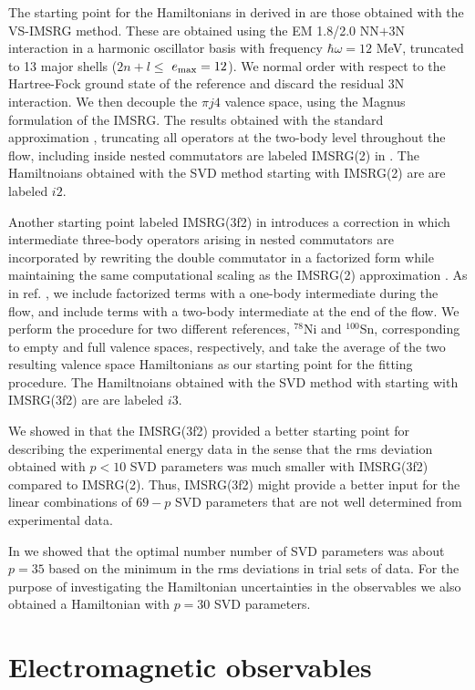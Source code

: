 \documentclass[aps,prl,twocolumn,tightenlines,superscriptaddress,showpacs]{revtex4-1}
\begin{document}
The starting point for the Hamiltonians in derived in \cite{p35i3}
are those obtained with the  VS-IMSRG method. These are
obtained using the EM 1.8/2.0 NN$+$3N interaction \cite{Heb2011} in a
harmonic oscillator basis with frequency $  \hbar \omega=12  $ MeV,
truncated to 13 major shells ($  2n+l \leq  $ $  e_{\rm max}=12  $). We normal order
with respect to the Hartree-Fock ground state of the reference and discard the
residual 3N interaction. We then decouple the $  \pi j4  $ valence space,
using the Magnus formulation of the IMSRG.
The results obtained with the standard approximation \cite{sr19}, truncating all
operators at the two-body level throughout the flow, including inside
nested commutators are labeled IMSRG(2) in \cite{p35i3}.
The Hamiltnoians obtained
with the SVD method starting with IMSRG(2) are are labeled $  i2  $.

Another starting point labeled IMSRG(3f2) in \cite{p35i3}
introduces a correction in which intermediate three-body operators arising
in nested commutators are incorporated by rewriting the double
commutator in a factorized form while maintaining the same computational
scaling as the IMSRG(2) approximation \cite{He24}. As in ref. \cite{He24}, we include factorized 
terms
with a one-body intermediate during the flow, and include terms with a
two-body intermediate at the end of the flow. We perform the procedure for
two different references, $^{78}$Ni and $^{100}$Sn, corresponding to empty
and full valence spaces, respectively, and take the average of the two resulting
valence space Hamiltonians as our starting point for the fitting procedure.
The Hamiltnoians obtained
with the SVD method with starting with IMSRG(3f2) are are labeled $  i3  $.

We showed in \cite{p35i3} that the IMSRG(3f2) provided a better starting
point for describing the experimental energy data in the sense that
the rms deviation obtained with $  p<10  $ SVD parameters was
much smaller with IMSRG(3f2) compared to IMSRG(2). Thus,
IMSRG(3f2) might provide a better input for the linear combinations
of $  69-p  $ SVD parameters that are not well determined from experimental
data.


In \cite{p35i3} we showed that the optimal number number of SVD parameters
was about $  p=35  $ based on the minimum in the rms deviations in trial sets of data.
For the purpose of investigating the Hamiltonian uncertainties
in the observables we also obtained a Hamiltonian with $  p=30  $
SVD parameters.


\section{Electromagnetic observables}
\end{document}
